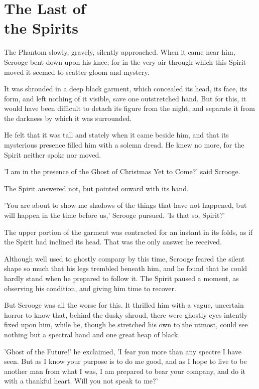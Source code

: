 \chapter{The Last of\\the Spirits}

The Phantom slowly, gravely, silently approached. When it came near him,
Scrooge bent down upon his knee; for in the very air through which this
Spirit moved it seemed to scatter gloom and mystery.

It was shrouded in a deep black garment, which concealed its head, its
face, its form, and left nothing of it visible, save one outstretched
hand. But for this, it would have been difficult to detach its figure
from the night, and separate it from the darkness by which it was
surrounded.

He felt that it was tall and stately when it came beside him, and that
its mysterious presence filled him with a solemn dread. He knew no more,
for the Spirit neither spoke nor moved.

'I am in the presence of the Ghost of Christmas Yet to Come?' said
Scrooge.

The Spirit answered not, but pointed onward with its hand.

'You are about to show me shadows of the things that have not happened,
but will happen in the time before us,' Scrooge pursued. 'Is that so,
Spirit?'

The upper portion of the garment was contracted for an instant in its
folds, as if the Spirit had inclined its head. That was the only answer
he received.

Although well used to ghostly company by this time, Scrooge feared the
silent shape so much that his legs trembled beneath him, and he found
that he could hardly stand when he prepared to follow it. The Spirit
paused a moment, as observing his condition, and giving him time to
recover.

But Scrooge was all the worse for this. It thrilled him with a vague,
uncertain horror to know that, behind the dusky shroud, there were
ghostly eyes intently fixed upon him, while he, though he stretched his
own to the utmost, could see nothing but a spectral hand and one great
heap of black.

'Ghost of the Future!' he exclaimed, 'I fear you more than any spectre
I have seen. But as I know your purpose is to do me good, and as I hope
to live to be another man from what I was, I am prepared to bear your
company, and do it with a thankful heart. Will you not speak to me?'

